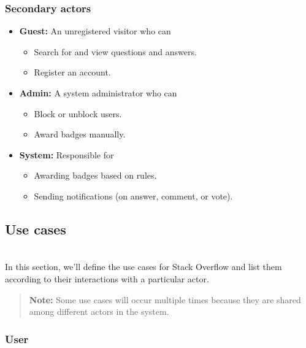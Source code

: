 \subsubsection{Secondary actors}\label{QdKhmIgRSSztFD_hb0qvS}

\begin{itemize}
\item
\textbf{Guest:} An unregistered visitor who can

\begin{itemize}
\item
Search for and view questions and answers.
\item
Register an account.
\end{itemize}
\item
\textbf{Admin:} A system administrator who can

\begin{itemize}
\item
Block or unblock users.
\item
Award badges manually.
\end{itemize}
\item
\textbf{System:} Responsible for

\begin{itemize}
\item
Awarding badges based on rules.
\item
Sending notifications (on answer, comment, or vote).
\end{itemize}
\end{itemize}

\subsection{Use cases}\label{hbN7X8Ukq4zCeFkaBe5Om}
\\
In this section, we'll define the use cases for Stack Overflow and list them according to their interactions with a particular actor.
\begin{quote}
\textbf{Note:} Some use cases will occur multiple times because they are shared among different actors in the system.
\end{quote}
\subsubsection{User}\label{okJUJF6rHqL3DacFw4oeK}

